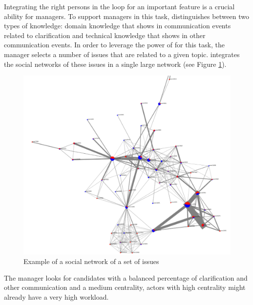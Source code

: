Integrating the right persons in the loop for an important feature is a crucial ability for managers.
To support managers in this task, \viss distinguishes between two types of knowledge: domain knowledge that shows in communication events related to clarification and technical knowledge that shows in other communication events.
In order to leverage the power of \viss for this task, the manager selects a number of issues that are related to a given topic. 
\viss integrates the social networks of these issues in a single large network (see Figure \ref{fig:example-sn-large}).
\begin{figure}
\includegraphics[width=\columnwidth]{img/example-sn-large}
\caption{Example of a social network of a set of issues}
\label{fig:example-sn-large}
\end{figure}
The manager looks for candidates with a balanced percentage of clarification and other communication and a medium centrality, actors with high centrality might already have a very high workload.
